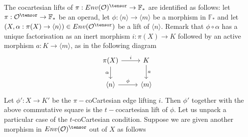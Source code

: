 \begin{remark}
The cocartesian lifts of $\pi:Env(\mathcal{O})^\tensor\rightarrow \mathbb{F}_*$ are identified as follows: let $\pi:\mathcal{O}^\tensor\rightarrow \mathbb{F}_*$ be an operad, let $\phi:\langle n \rangle \rightarrow \langle m \rangle$ be a morphism in $\mathbb{F}_*$ and let $(X,\alpha:\pi(X)\rightarrow \langle n \rangle)\in Env(\mathcal{O}^\tensor)$ be a lift of $\langle n\rangle$. Remark that $\phi\circ\alpha$ has a unique factorisation as an inert morphism $i:\pi(X)\rightarrow K$ followed by an active morphism $a:K\rightarrow \langle m \rangle$, as in the following diagram
\[\begin{tikzcd}
\pi(X) \arrow[r, "i"] \arrow[d, "\alpha"'] & K \arrow[d, "a"]  \\
\langle n \rangle \arrow[r, "\phi"]           & \langle m \rangle
\end{tikzcd}\]
Let $\phi':X\rightarrow K'$ be the $\pi-$coCartesian edge lifting $i$. Then $\phi'$ together with the above commutative square is the $t-$cocartesian lift of $\phi$. Let us unpack a particular case of the $t$-coCartesian condition. Suppose we are given another morphism in $Env(\mathcal{O})^\tensor$ out of $X$ as follows


\end{remark}
